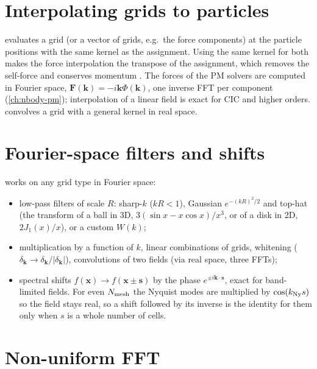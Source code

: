 \section{Interpolating grids to particles}\label{sec:ma-interpolation}

 evaluates a grid (or a vector of grids, e.g.\ the force components) at the particle
positions with the same kernel as the assignment. Using the same kernel for both makes the force interpolation the transpose of the
assignment, which removes the self-force and conserves momentum \cite{HockneyEastwood1988}. The forces of the PM solvers are computed
in Fourier space, $\bm F(\bm k)=-i\bm k\Phi(\bm k)$, one inverse FFT per component (\cref{ch:nbody-pm}); interpolation of a linear field
is exact for CIC and higher orders.  convolves a grid with a general kernel in real space.

\section{Fourier-space filters and shifts}\label{sec:ma-smoothing}

 works on any grid type in Fourier space:
\begin{itemize}
\item low-pass filters of scale $R$: sharp-$k$ ($kR<1$), Gaussian $e^{-(kR)^2/2}$ and top-hat (the transform of a ball in 3D,
      $3(\sin x-x\cos x)/x^3$, or of a disk in 2D, $2J_1(x)/x$), or a custom $W(k)$;
\item multiplication by a function of $k$, linear combinations of grids, whitening ($\delta_{\bm k}\to\delta_{\bm k}/|\delta_{\bm k}|$),
      convolutions of two fields (via real space, three FFTs);
\item spectral shifts $f(\bm x)\to f(\bm x\pm\bm s)$ by the phase $e^{\pm i\bm k\cdot\bm s}$, exact for band-limited fields. For even
      $N_{\rm mesh}$ the Nyquist modes are multiplied by $\cos(k_{\rm Ny}s)$ so the field stays real, so a shift followed by its inverse is
      the identity for them only when $s$ is a whole number of cells.
\end{itemize}

\section{Non-uniform FFT}\label{sec:ma-nufft}

